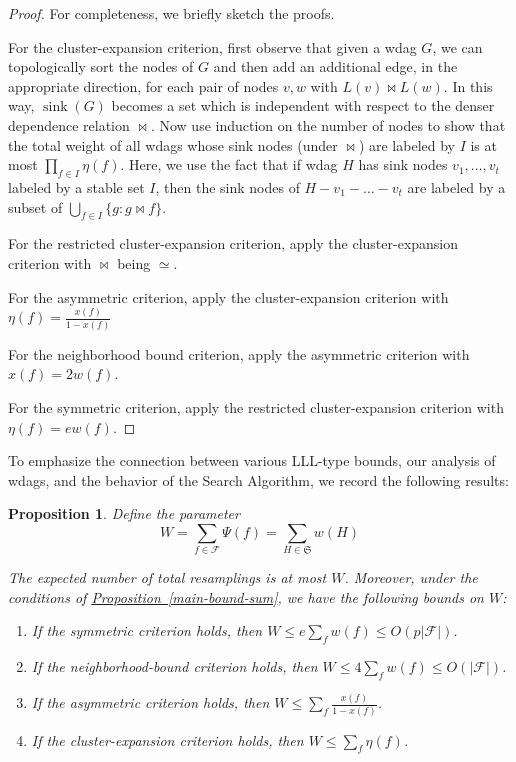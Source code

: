 \documentclass[11pt]{article}
\newcommand{\expref}[2]{\texorpdfstring{\hyperref[#2]{#1~\ref{#2}}}{#1~\ref{#2}}}
\newtheorem{proposition}[theorem]{Proposition}
\DeclareMathOperator{\sink}{sink}
\begin{document}
\begin{proof}
For completeness, we briefly sketch the proofs. 

For the cluster-expansion criterion, first observe that given
%
a  %
wdag $G$, we can topologically sort the nodes of $G$ and
%
 then add an additional edge, in the appropriate direction,
for each pair of nodes $v, w$ with $L(v) \bowtie L(w)$. 
In this way, $\sink(G)$ becomes a set which is independent with respect to the denser dependence relation $\bowtie$. Now use induction on 
the number of nodes %
%
to show that the total weight of all wdags whose sink nodes (under $\bowtie$) are labeled by $I$ is at most  $\prod_{f \in I} \eta(f)$. Here, we use the fact that if wdag $H$ has sink nodes $v_1, \dots, v_t$ labeled by a stable set $I$, then the sink nodes of $H - v_1 - \dots - v_t$ are labeled by a subset of $\bigcup_{f \in I} \{g: g \bowtie f \}$.

For the restricted cluster-expansion criterion, apply the cluster-expansion criterion with $\bowtie$ being $\simeq$.

For the asymmetric criterion, apply the cluster-expansion criterion with $\eta(f) = \frac{x(f)}{1 - x(f)}$

For the neighborhood bound criterion, apply the asymmetric criterion with $x(f) = 2 w(f)$.

For the symmetric criterion, apply the restricted cluster-expansion criterion with  $\eta(f) = e w(f)$.
\end{proof}

To emphasize the connection between various LLL-type bounds, our analysis of wdags, and the behavior of the Search Algorithm, we record the following results:
\begin{proposition}       %
\label{bndcord1}
Define the parameter
 $$
 W = \sum_{f \in \mathcal F} \Psi(f) = \sum_{H \in \mathfrak S} w(H)
 $$

The expected number of total %
resamplings %
is at most $W$.   Moreover, under the conditions of \expref{Proposition}{main-bound-sum}, we have the following bounds on $W$:
\begin{enumerate}
\item If the symmetric criterion holds, then $W \leq e  \sum_f w(f) \leq O( p |\mathcal F| )$.

\item If the neighborhood-bound criterion holds, then $W  \leq 4  \sum_f w(f) \leq O( |\mathcal F| )$.
\item If the asymmetric criterion holds, then $W  \leq  \sum_f \frac{x(f)}{1-x(f)}$.
\item If the cluster-expansion criterion holds, then $W \leq \sum_f \eta(f)$.
\end{enumerate}
\end{proposition}
\end{document}
